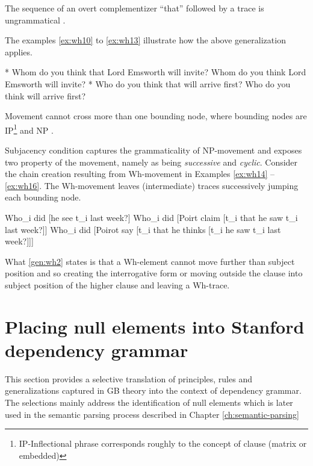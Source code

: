 \begin{generalization}\label{gen:wh1}
	The sequence of an overt complementizer ``that'' followed by a trace is ungrammatical \cite[p.~399]{Haegeman1991}.
\end{generalization}

The examples \ref{ex:wh10} to \ref{ex:wh13} illustrate how the above generalization applies. 
\begin{exe}
	\ex\label{ex:wh10} * Whom do you think that Lord Emsworth will invite?
	\ex\label{ex:wh11} Whom do you think Lord Emsworth will invite?
	\ex\label{ex:wh12} * Who do you think that will arrive first?
	\ex\label{ex:wh13} Who do you think will arrive first?
\end{exe}

\begin{generalization}\label{gen:wh2}
	Movement cannot cross more than one bounding node, where bounding nodes are IP\footnote{IP-Inflectional phrase corresponds roughly to the concept of clause (matrix or embedded)} and NP \cite[p.~402]{Haegeman1991}.
\end{generalization}

Subjacency condition captures the grammaticality of NP-movement and exposes two property of the movement, namely as being \textit{successive} and \textit{cyclic}. Consider the chain creation resulting from Wh-movement in Examples \ref{ex:wh14} -- \ref{ex:wh16}. The Wh-movement leaves (intermediate) traces successively jumping each bounding node. 

\begin{exe}
	\ex\label{ex:wh14} Who_{i} did [he see t_{i} last week?]
	\ex\label{ex:wh15} Who_{i} did [Poirt claim [t_{i} that he saw t_{i} last week?]]
	\ex\label{ex:wh16} Who_{i} did [Poirot say [t_{i} that he thinks [t_{i} he saw t_{i} last week?]]]
\end{exe}

What \ref{gen:wh2} states is that a Wh-element cannot move further than subject position and so creating the interrogative form or moving outside the clause into subject position of the higher clause and leaving a Wh-trace.

\section{Placing null elements into Stanford dependency grammar}
\label{sec:placing-null-elements}

This section provides a selective translation of principles, rules and generalizations captured in GB theory into the context of dependency grammar. The selections mainly address the identification of null elements which is later used in the semantic parsing process described in Chapter \ref{ch:semantic-parsing}

